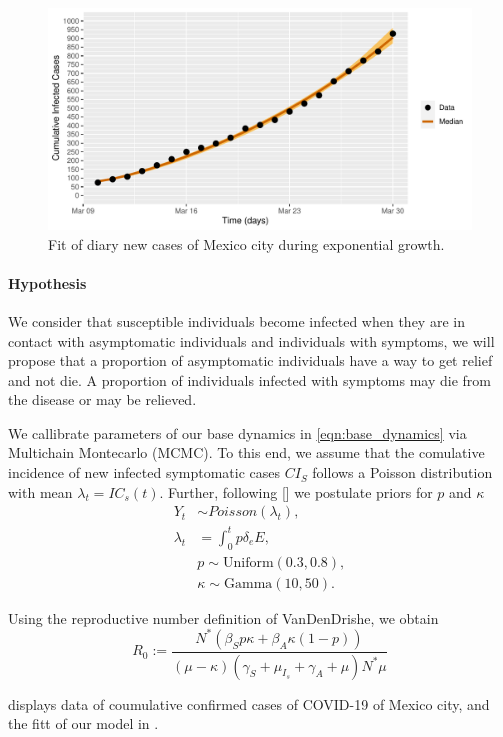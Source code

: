 \begin{figure}[htb]
	\centering
   	\includegraphics[scale=0.8, keepaspectratio]{./cdmx_CIs_data_begining_fit}
   	\caption{%
   		Fit of diary new cases of Mexico city
   		during exponential growth.
   	}
    \label{fig:data_CDMX_fitting}
\end{figure}
%
    \paragraph{Hypothesis} 
    	We consider that susceptible individuals become
    infected when they are in contact with asymptomatic individuals and
    individuals with symptoms, we will propose that a proportion of
    asymptomatic individuals have a way to get relief and not die. A
    proportion of individuals infected with symptoms may die from the
    disease or may be relieved.

    	We callibrate parameters of our base dynamics in
    \eqref{eqn:base_dynamics} via Multichain Montecarlo (MCMC).
    To this end, we assume that the comulative
    incidence of new infected symptomatic cases $CI_S$
    follows a Poisson distribution with mean $\lambda_t = IC_s(t)$. Further,
    following [] we postulate priors for $p$ and $\kappa$
    \begin{equation}
    	\label{eqn:boservation_model}
    	\begin{aligned}
    		Y_t & \sim Poisson(\lambda_t),
    		\\
    		\lambda_t
    			&=
    			\int_{0}^t p \delta_e E ,
    		\\
    			& p \sim \text{Uniform} (0.3, 0.8),
    		\\
    			& \kappa \sim \text{Gamma}(10, 50).
    	\end{aligned}
    \end{equation}
	
	Using the reproductive number definition of VanDenDrishe, we obtain
\begin{equation*}
	\label{eqn:reproductive_number}
	R_0 :=
		\frac{
			N^{*}(
				\beta_S p
				\kappa +
				\beta_A
				\kappa(1-p) )
		}{
			(\mu - \kappa)( \gamma_S + \mu_{I_s} + \gamma_A + \mu)
			N^* \mu
		}
\end{equation*}

     displays data of coumulative confirmed cases 
of COVID-19 of Mexico city, and the fitt of our model in
.
